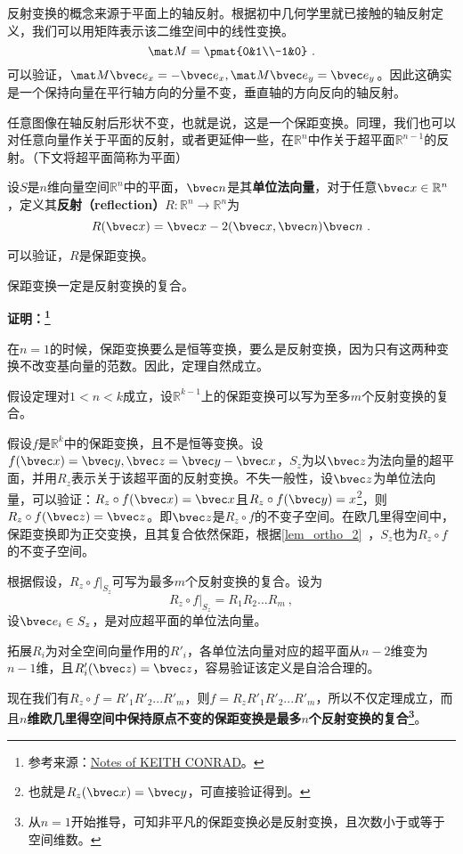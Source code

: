 反射变换的概念来源于平面上的轴反射。根据初中几何学里就已接触的轴反射定义，我们可以用矩阵表示该二维空间中的线性变换。
\begin{equation}
\mat M=\pmat{0&1\\-1&0}~.
\end{equation}
可以验证，$\mat M\bvec e_x=-\bvec e_x,\mat M \bvec e_y=\bvec e_y$。因此这确实是一个保持向量在平行轴方向的分量不变，垂直轴的方向反向的轴反射。

任意图像在轴反射后形状不变，也就是说，这是一个保距变换。同理，我们也可以对任意向量作关于平面的反射，或者更延伸一些，在$\mathbb R^n$中作关于超平面$\mathbb R^{n-1}$的反射。（下文将超平面简称为平面）
\begin{definition}{}
设$S$是$n$维向量空间$\mathbb R^n$中的平面，$\bvec n$是其\textbf{单位法向量}，对于任意$\bvec x\in \mathbb R^n$，定义其\textbf{反射（reflection）}$R:\mathbb R^n\rightarrow \mathbb R^n$为
\begin{equation}
R(\bvec x)=\bvec x-2(\bvec x,\bvec n)\bvec n~.
\end{equation}
\end{definition}
可以验证，$R$是保距变换。


\begin{theorem}{}
保距变换一定是反射变换的复合。
\end{theorem}
\textbf{证明：\footnote{参考来源：\href{https://kconrad.math.uconn.edu/blurbs/grouptheory/isometryRn.pdf}{Notes of KEITH CONRAD}。}}

在$n=1$的时候，保距变换要么是恒等变换，要么是反射变换，因为只有这两种变换不改变基向量的范数。因此，定理自然成立。

假设定理对$1<n<k$成立，设$\mathbb R^{k-1}$上的保距变换可以写为至多$m$个反射变换的复合。 

假设$f$是$\mathbb R^k$中的保距变换，且不是恒等变换。设$f(\bvec x)=\bvec y,\bvec z=\bvec y-\bvec x$，$S_z$为以$\bvec z$为法向量的超平面，并用$R_z$表示关于该超平面的反射变换。不失一般性，设$\bvec z$为单位法向量，可以验证：$R_z\circ f(\bvec x)=\bvec x$且$R_z\circ f(\bvec y)=x$\footnote{也就是$R_z(\bvec x)=\bvec y$，可直接验证得到。}，则$R_z\circ f(\bvec z)=\bvec z$。即$\bvec z$是$R_z\circ f$的不变子空间。在欧几里得空间中，保距变换即为正交变换，且其复合依然保距，根据\autoref{lem_ortho_2}~，$S_z$也为$R_z\circ f$的不变子空间。

根据假设，$R_z\circ f|_{S_z}$可写为最多$m$个反射变换的复合。设为
\begin{equation}
R_z\circ f|_{S_z}=R_1R_2...R_{m}~,
\end{equation}
设$\bvec e_i\in S_z$，是对应超平面的单位法向量。

拓展$R_i$为对全空间向量作用的$R'_i$，各单位法向量对应的超平面从$n-2$维变为$n-1$维，且$R'_i(\bvec z)=\bvec z$，容易验证该定义是自洽合理的。

现在我们有$R_z \circ f=R'_1R'_2...R'_{m}$，则$f=R_zR'_1R'_2...R'_{m}$，所以不仅定理成立，而且\textbf{$n$维欧几里得空间中保持原点不变的保距变换是最多$n$个反射变换的复合\footnote{从$n=1$开始推导，可知非平凡的保距变换必是反射变换，且次数小于或等于空间维数。}}。

